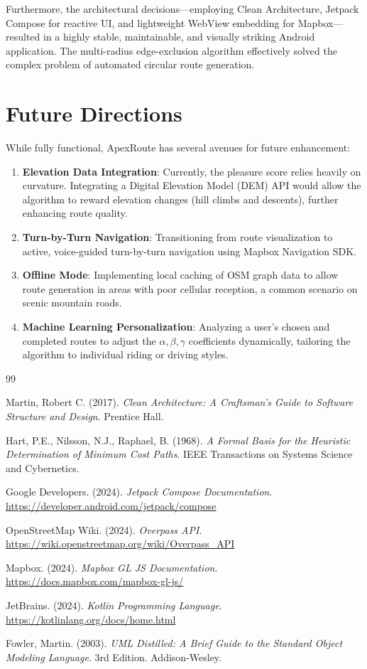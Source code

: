 \documentclass[12pt,a4paper,oneside]{report}
\begin{document}
Furthermore, the architectural decisions—employing Clean Architecture, Jetpack Compose for reactive UI, and lightweight WebView embedding for Mapbox—resulted in a highly stable, maintainable, and visually striking Android application. The multi-radius edge-exclusion algorithm effectively solved the complex problem of automated circular route generation.

\section{Future Directions}
While fully functional, ApexRoute has several avenues for future enhancement:
\begin{enumerate}
    \item \textbf{Elevation Data Integration}: Currently, the pleasure score relies heavily on curvature. Integrating a Digital Elevation Model (DEM) API would allow the algorithm to reward elevation changes (hill climbs and descents), further enhancing route quality.
    \item \textbf{Turn-by-Turn Navigation}: Transitioning from route visualization to active, voice-guided turn-by-turn navigation using Mapbox Navigation SDK.
    \item \textbf{Offline Mode}: Implementing local caching of OSM graph data to allow route generation in areas with poor cellular reception, a common scenario on scenic mountain roads.
    \item \textbf{Machine Learning Personalization}: Analyzing a user's chosen and completed routes to adjust the $\alpha, \beta, \gamma$ coefficients dynamically, tailoring the algorithm to individual riding or driving styles.
\end{enumerate}

\renewcommand{\bibname}{References}
\begin{thebibliography}{99}

Martin, Robert C. (2017). \textit{Clean Architecture: A Craftsman's Guide to Software Structure and Design}. Prentice Hall.

Hart, P.E., Nilsson, N.J., Raphael, B. (1968). \textit{A Formal Basis for the Heuristic Determination of Minimum Cost Paths}. IEEE Transactions on Systems Science and Cybernetics.

Google Developers. (2024). \textit{Jetpack Compose Documentation}. \url{https://developer.android.com/jetpack/compose}

OpenStreetMap Wiki. (2024). \textit{Overpass API}. \url{https://wiki.openstreetmap.org/wiki/Overpass_API}

Mapbox. (2024). \textit{Mapbox GL JS Documentation}. \url{https://docs.mapbox.com/mapbox-gl-js/}

JetBrains. (2024). \textit{Kotlin Programming Language}. \url{https://kotlinlang.org/docs/home.html}

Fowler, Martin. (2003). \textit{UML Distilled: A Brief Guide to the Standard Object Modeling Language}. 3rd Edition. Addison-Wesley.

\end{thebibliography}
\end{document}
